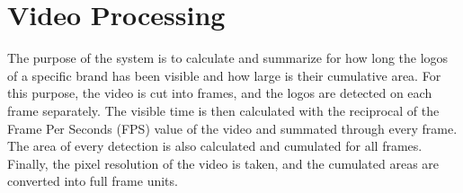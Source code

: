 \section{Video Processing}
The purpose of the system is to calculate and summarize for how long the logos of a specific brand has been visible and how large is their cumulative area. For this purpose, the video is cut into frames, and the logos are detected on each frame separately. The visible time is then calculated with the reciprocal of the Frame Per Seconds (FPS) value of the video and summated through every frame. The area of every detection is also calculated and cumulated for all frames. Finally, the pixel resolution of the video is taken, and the cumulated areas are converted into full frame units.